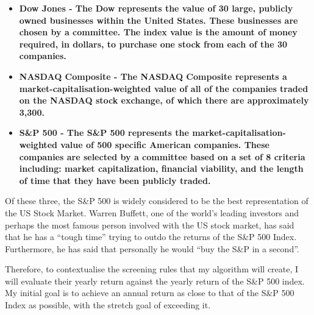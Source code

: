 \begin{itemize}
    \item \bf Dow Jones \rm - The Dow represents the value of 30 large, publicly owned businesses within the United States. These businesses are chosen by a committee. The index value is the amount of money required, in dollars, to purchase one stock from each of the 30 companies.
    \item \bf NASDAQ Composite \rm - The NASDAQ Composite represents a market-capitalisation-weighted value of all of the companies traded on the NASDAQ stock exchange, of which there are approximately 3,300.
    \item \bf S\&P 500 \rm - The S\&P 500 represents the market-capitalisation-weighted value of 500 specific American companies. These companies are selected by a committee based on a set of 8 criteria including:  market capitalization, financial viability, and the length of time that they have been publicly traded.
\end{itemize}

Of these three, the S\&P 500 is widely considered to be the best representation of the US Stock Market. \cite{snp500Best} Warren Buffett, one of the world's leading investors and perhaps the most famous person involved with the US stock market, has said that he has a ``tough time'' trying to outdo the returns of the S\&P 500 Index. Furthermore, he has said that personally he would ``buy the S\&P in a second''. \cite{buffettsnp} \newline

Therefore, to contextualise the screening rules that my algorithm will create, I will evaluate their yearly return against the yearly return of the S\&P 500 index. My initial goal is to achieve an annual return as close to that of the S\&P 500 Index as possible, with the stretch goal of exceeding it.